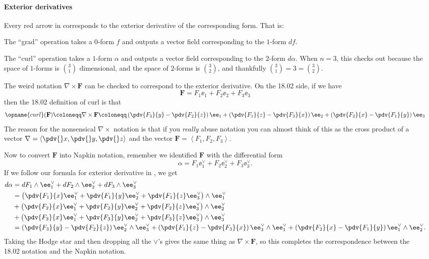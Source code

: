 \paragraph{Exterior derivatives}
Every red arrow in  corresponds to the exterior derivative
of the corresponding form.
That is:
\begin{itemize}
	\ii The ``grad'' operation takes a $0$-form $f$ and outputs a vector field
	corresponding to the $1$-form $df$.

	\ii The ``curl'' operation takes a $1$-form $\alpha$ and outputs a vector field
	corresponding to the $2$-form $d\alpha$.
	When $n = 3$, this checks out because the space of $1$-forms is $\binom 31$ dimensional,
	and the space of $2$-forms is $\binom 32$, and thankfully $\binom 31 = 3 = \binom 32$.

	The weird notation $\nabla \times \mathbf{F}$
	can be checked to correspond to the exterior derivative.
	On the 18.02 side, if we have
	\[ \mathbf{F} = F_1 \ee_1 + F_2 \ee_2 + F_3 \ee_3 \]
	then the 18.02 definition of curl is that
	\[ \opname{curl}(\mathbf{F}) \coloneqq \nabla \times \mathbf{F} \coloneqq
		\left( \pdv{F_3}{y} - \pdv{F_2}{z} \right) \ee_1
		+ \left( \pdv{F_1}{z} - \pdv{F_3}{x} \right) \ee_2
		+ \left( \pdv{F_2}{x} - \pdv{F_1}{y} \right) \ee_3
	\]
	The reason for the nonsensical $\nabla \times$ notation
	is that if you \emph{really} abuse notation you can almost think of this as
	the cross product of a vector $\nabla = \left< \pdv{}x, \pdv{}y, \pdv{}z \right>$
	and the vector $\mathbf{F} = \left< F_1, F_2, F_3 \right>$.

	Now to convert $\mathbf{F}$ into Napkin notation,
	remember we identified $\mathbf{F}$ with the differential form
	\[ \alpha = F_1 \ee_1^\vee + F_2 \ee_2^\vee + F_3 \ee_3^\vee. \]
	If we follow our formula for exterior derivative in , we get
	\begin{align*}
		d\alpha &= dF_1 \wedge \ee_1^\vee + dF_2 \wedge \ee_2^\vee + dF_3 \wedge \ee_3^\vee \\
		&= \left( \pdv{F_1}{x} \ee_1^\vee + \pdv{F_1}{y} \ee_2^\vee + \pdv{F_1}{z} \ee_3^\vee \right) \wedge \ee_1^\vee \\
		&+ \left( \pdv{F_2}{x} \ee_1^\vee + \pdv{F_2}{y} \ee_2^\vee + \pdv{F_2}{z} \ee_3^\vee \right) \wedge \ee_2^\vee \\
		&+ \left( \pdv{F_3}{x} \ee_1^\vee + \pdv{F_3}{y} \ee_2^\vee + \pdv{F_3}{z} \ee_3^\vee \right) \wedge \ee_3^\vee \\
		&=
		\left( \pdv{F_3}{y} - \pdv{F_2}{z} \right) \ee_2^\vee \wedge \ee_3^\vee
		+ \left( \pdv{F_1}{z} - \pdv{F_3}{x} \right) \ee_3^\vee \wedge \ee_1^\vee
		+ \left( \pdv{F_2}{x} - \pdv{F_1}{y} \right) \ee_1^\vee \wedge \ee_2^\vee.
	\end{align*}
	Taking the Hodge star and then dropping all the $\vee$'s
	gives the same thing as $\nabla \times \mathbf{F}$,
	so this completes the correspondence between the 18.02 notation and the Napkin notation.


\end{itemize}
